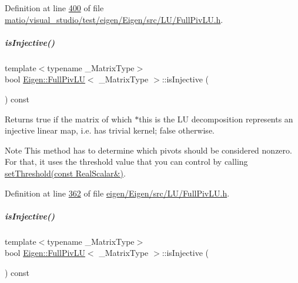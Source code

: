 Definition at line \hyperlink{matio_2visual__studio_2test_2eigen_2_eigen_2src_2_l_u_2_full_piv_l_u_8h_source_l00400}{400} of file \hyperlink{matio_2visual__studio_2test_2eigen_2_eigen_2src_2_l_u_2_full_piv_l_u_8h_source}{matio/visual\+\_\+studio/test/eigen/\+Eigen/src/\+L\+U/\+Full\+Piv\+L\+U.\+h}.

\mbox{\label{group___l_u___module_ab13992c852aa593461d9b81790b56667}} 
\subparagraph{\texorpdfstring{is\+Injective()}{isInjective()}\hspace{0.1cm}{\footnotesize\ttfamily [1/2]}}
{\footnotesize\ttfamily template$<$typename \+\_\+\+Matrix\+Type$>$ \\
bool \hyperlink{group___l_u___module_class_eigen_1_1_full_piv_l_u}{Eigen\+::\+Full\+Piv\+LU}$<$ \+\_\+\+Matrix\+Type $>$\+::is\+Injective (\begin{DoxyParamCaption}{ }\end{DoxyParamCaption}) const\hspace{0.3cm}{\ttfamily [inline]}}

\begin{DoxyReturn}{Returns}
true if the matrix of which $\ast$this is the LU decomposition represents an injective linear map, i.\+e. has trivial kernel; false otherwise.
\end{DoxyReturn}
\begin{DoxyNote}{Note}
This method has to determine which pivots should be considered nonzero. For that, it uses the threshold value that you can control by calling \hyperlink{group___l_u___module_a414592d82de98f5bd075965caf56d681}{set\+Threshold(const Real\+Scalar\&)}. 
\end{DoxyNote}


Definition at line \hyperlink{eigen_2_eigen_2src_2_l_u_2_full_piv_l_u_8h_source_l00362}{362} of file \hyperlink{eigen_2_eigen_2src_2_l_u_2_full_piv_l_u_8h_source}{eigen/\+Eigen/src/\+L\+U/\+Full\+Piv\+L\+U.\+h}.

\mbox{\label{group___l_u___module_ab13992c852aa593461d9b81790b56667}} 
\subparagraph{\texorpdfstring{is\+Injective()}{isInjective()}\hspace{0.1cm}{\footnotesize\ttfamily [2/2]}}
{\footnotesize\ttfamily template$<$typename \+\_\+\+Matrix\+Type$>$ \\
bool \hyperlink{group___l_u___module_class_eigen_1_1_full_piv_l_u}{Eigen\+::\+Full\+Piv\+LU}$<$ \+\_\+\+Matrix\+Type $>$\+::is\+Injective (\begin{DoxyParamCaption}{ }\end{DoxyParamCaption}) const\hspace{0.3cm}{\ttfamily [inline]}}

